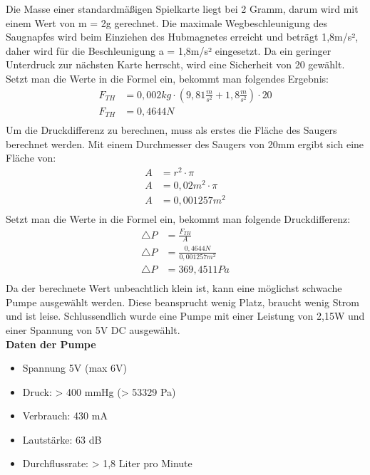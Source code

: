 Die Masse einer standardmäßigen  Spielkarte liegt bei 2 Gramm, darum wird mit einem Wert von m = 2g gerechnet.
Die maximale Wegbeschleunigung des Saugnapfes wird beim Einziehen des Hubmagnetes erreicht und
beträgt 1,8m/s²,
daher wird für die Beschleunigung a = 1,8m/s² eingesetzt.
Da ein geringer Unterdruck zur nächsten Karte herrscht, wird eine Sicherheit von 20 gewählt.
Setzt man die Werte in die Formel ein, bekommt man folgendes Ergebnis: \\
\begin{align*}
F_{TH} &= 0,002kg\cdot (9,81\frac{m}{s^{2}}+1,8\frac{m}{s^{2}})\cdot 20\\
F_{TH} &= 0,4644N\\
\end{align*}
Um die Druckdifferenz zu berechnen, muss als erstes die Fläche des Saugers berechnet werden.
Mit einem Durchmesser des Saugers von 20mm ergibt sich eine Fläche von:
\begin{align*}
A &= r^{2}\cdot \pi\\
A &= 0,02m^{2}\cdot \pi\\
A &= 0,001257m^{2}\\
\end{align*}
Setzt man die Werte in die Formel ein, bekommt man folgende Druckdifferenz:
\begin{align*}
\triangle P &= \frac{F_{TH}}{A}\\
\triangle P &= \frac{0,4644N}{0,001257m^{2}}\\
\triangle P &= 369,4511Pa\\
\end{align*}
Da der berechnete Wert unbeachtlich klein ist, kann eine möglichst schwache Pumpe ausgewählt werden.
Diese beansprucht wenig Platz, braucht wenig Strom und ist leise.
Schlussendlich wurde eine Pumpe mit einer Leistung von 2,15W und einer Spannung von 5V DC ausgewählt.\\
\textbf{Daten der Pumpe}
\begin{itemize}
    \item Spannung 5V (max 6V)
    \item Druck: > 400 mmHg (> 53329 Pa)
    \item Verbrauch: 430 mA
    \item Lautstärke: 63 dB
    \item Durchflussrate: > 1,8 Liter pro Minute
\end{itemize}

\newpage

